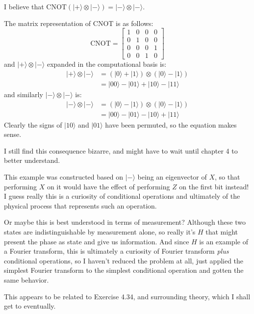 \documentclass[]{article}
\newcommand{\ket}[1]{| #1 \rangle}
\newcommand{\CNOT}{\text{CNOT}}
\begin{document}
I believe that $\CNOT\left(\ket{+}\otimes\ket{-}\right) = \ket{-}\otimes\ket{-}$.

The matrix representation of CNOT is as follows:
\[
\CNOT = \left[\begin{matrix}
1&0&0&0\\
0&1&0&0\\
0&0&0&1\\
0&0&1&0
\end{matrix}\right]
\]
and $\ket{+}\otimes\ket{-}$ expanded in the computational basis is:
\begin{align*}
\ket{+}\otimes\ket{-}
&= \left(\ket{0}+\ket{1}\right) \otimes\left(\ket{0}-\ket{1}\right)
\\&= \ket{00}-\ket{01}+\ket{10}-\ket{11}
\end{align*}
and similarly $\ket{-}\otimes\ket{-}$ is:
\begin{align*}
\ket{-}\otimes\ket{-}
&= \left(\ket{0}-\ket{1}\right) \otimes\left(\ket{0}-\ket{1}\right)
\\&= \ket{00}-\ket{01}-\ket{10}+\ket{11}
\end{align*}
Clearly the signs of $\ket{10}$ and $\ket{01}$ have been permuted, so the equation makes sense.

I still find this consequence bizarre, and might have to wait until chapter 4 to better understand.

This example was constructed based on $\ket{-}$ being an eigenvector of $X$, so that performing $X$ on it would have the effect of performing $Z$ on the first bit instead! I guess really this is a curiosity of conditional operations and ultimately of the physical process that represents such an operation.

Or maybe this is best understood in terms of measurement? Although these two states are indistinguishable by measurement alone, so really it's $H$ that might present the phase as state and give us information. And since $H$ is an example of a Fourier transform, this is ultimately a curiosity of Fourier transform \textit{plus} conditional operations, so I haven't reduced the problem at all, just applied the simplest Fourier transform to the simplest conditional operation and gotten the same behavior.

This appears to be related to Exercise 4.34, and surrounding theory, which I shall get to eventually.
\end{document}
